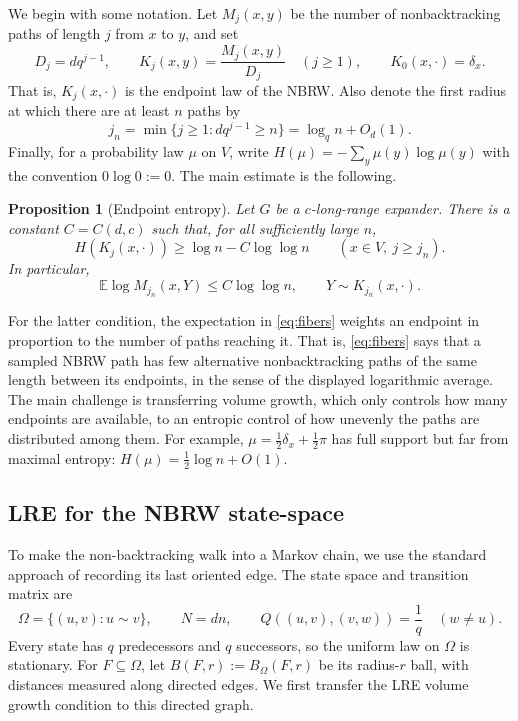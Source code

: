 \documentclass[11pt,reqno]{amsart}
\newtheorem{proposition}[theorem]{Proposition}
\theoremstyle{definition}
\begin{document}
We begin with some notation. Let $M_j(x,y)$ be the number of nonbacktracking paths of length $j$ from $x$ to $y$, and set
\[
     D_j=dq^{j-1},\qquad K_j(x,y)=\frac{M_j(x,y)}{D_j}
     \quad(j\ge1),\qquad K_0(x,\cdot)=\delta_x.
\]
That is, $K_j(x,\cdot)$ is the endpoint law of the NBRW. Also denote the first radius at which there are at least $n$ paths by
\[
 j_n=\min\{j\ge1:dq^{j-1}\ge n\}=\log_q n+O_d(1).
\]
Finally, for a probability law $\mu$ on $V$, write $H(\mu)=-\sum_y\mu(y)\log\mu(y)$ with the convention $0\log0:=0$. The main estimate is the following.

\begin{proposition}[Endpoint entropy]\label{prop:entropy}
Let $G$ be a $c$-long-range expander. There is a constant $C=C(d,c)$ such that, for all sufficiently large $n$,
\begin{equation}\label{eq:criticalentropy}
 H(K_j(x,\cdot))\ge\log n-C\log\log n
 \qquad(x\in V,\ j\ge j_n).
\end{equation}
In particular,
\begin{equation}\label{eq:fibers}
 \mathbb E\log M_{j_n}(x,Y)\le C\log\log n,
 \qquad Y\sim K_{j_n}(x,\cdot).
\end{equation}
\end{proposition}

For the latter condition, the expectation in \eqref{eq:fibers} weights an endpoint in proportion to the number of paths reaching it. That is, \eqref{eq:fibers} says that a sampled NBRW path has few alternative nonbacktracking paths of the same length between its endpoints, in the sense of the displayed logarithmic average. The main challenge is transferring volume growth, which only controls how many endpoints are available, to an entropic control of how unevenly the paths are distributed among them.
For example, $\mu=\frac12\delta_x+\frac12\pi$ has full support but far from maximal entropy:
$H(\mu)=\frac12\log n+O(1)$.

\subsection{LRE for the NBRW state-space}
\label{sec:nonbacktracking}

To make the non-backtracking walk into a Markov chain, we use the standard approach of recording its last oriented
edge. The state space and transition matrix are
\[
 \Omega=\{(u,v):u\sim v\},\qquad N=dn,\qquad
 Q((u,v),(v,w))=\frac1q\quad(w\ne u).
\]
Every state has $q$ predecessors and $q$ successors, so the uniform
law on $\Omega$ is stationary. For $F\subseteq\Omega$, let
$B(F,r) := B_\Omega(F,r)$ be its radius-$r$ ball, with distances measured along
directed edges. We first transfer the LRE volume growth condition to this
directed graph.
\end{document}
